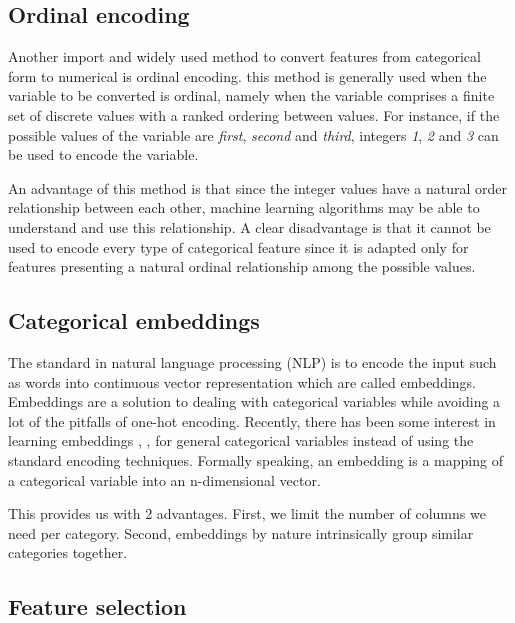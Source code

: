 \documentclass[LaM,binding=0.6cm, english]{sapthesis}
\begin{document}
\subsection{Ordinal encoding}

Another import and widely used method to convert features from categorical form to numerical is ordinal encoding. this method is generally used when the variable to be converted is ordinal, namely when the variable comprises a finite set of discrete values with a ranked ordering between values. For instance, if the possible values of the variable are \textit{first}, \textit{second} and \textit{third}, integers \textit{1}, \textit{2} and \textit{3} can be used to encode the variable. 

\par An advantage of this method is that since the integer values have a natural order relationship between each other, machine learning algorithms may be able to understand and use this relationship. A clear disadvantage is that it cannot be used to encode every type of categorical feature since it is adapted only for features presenting a natural ordinal relationship among the possible values.

\subsection{Categorical embeddings}

The standard in natural language processing (NLP) is to encode the input such as words into continuous vector representation which are called embeddings.\cite{Almeida2019} Embeddings are a solution to dealing with categorical variables while avoiding a lot of the pitfalls of one-hot encoding. Recently, there has
been some interest in learning embeddings \cite{Hannes}, \cite{Berkhahn2016}, \cite{Russac2018} for general
categorical variables instead of using the standard encoding
techniques. Formally speaking, an embedding is a mapping of a categorical variable into an n-dimensional vector.

This provides us with 2 advantages. First, we limit the number of columns we need per category. Second, embeddings by nature intrinsically group similar categories together.

\subsection{Feature selection}
\end{document}
